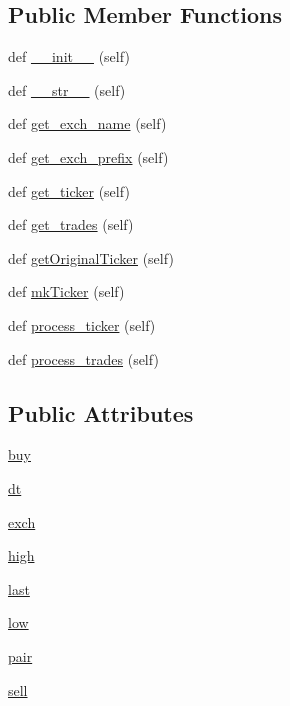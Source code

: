 \subsection*{Public Member Functions}
\begin{DoxyCompactItemize}
\item 
def \hyperlink{classexchange_1_1_fox_bit_a1f892137668748287116d902ef668d1a}{\+\_\+\+\_\+init\+\_\+\+\_\+} (self)
\item 
def \hyperlink{classexchange_1_1_fox_bit_ac21d1d06bf748dfd22ca35bc56a72e3b}{\+\_\+\+\_\+str\+\_\+\+\_\+} (self)
\item 
def \hyperlink{classexchange_1_1_fox_bit_a9bb3b48ee388b422f1d27c1774f0c9bf}{get\+\_\+exch\+\_\+name} (self)
\item 
def \hyperlink{classexchange_1_1_fox_bit_a091fb1b6e76b392b0a018a411f9da200}{get\+\_\+exch\+\_\+prefix} (self)
\item 
def \hyperlink{classexchange_1_1_fox_bit_aeb98818ddef05bb1beff5b55231d3760}{get\+\_\+ticker} (self)
\item 
def \hyperlink{classexchange_1_1_fox_bit_a80807753c2c595997857d097939c9283}{get\+\_\+trades} (self)
\item 
def \hyperlink{classexchange_1_1_fox_bit_adfca60ed33245c7bd9666893f6725bb9}{get\+Original\+Ticker} (self)
\item 
def \hyperlink{classexchange_1_1_fox_bit_a17b3a7fb364fbfd2c6cf34129194284c}{mk\+Ticker} (self)
\item 
def \hyperlink{classexchange_1_1_fox_bit_a813481c37754cc0c6e0b1cefa0ec0889}{process\+\_\+ticker} (self)
\item 
def \hyperlink{classexchange_1_1_fox_bit_a244f81e91b04a1118d2d17f6c8497cb5}{process\+\_\+trades} (self)
\end{DoxyCompactItemize}
\subsection*{Public Attributes}
\begin{DoxyCompactItemize}
\item 
\hyperlink{classexchange_1_1_fox_bit_acb7e709cc05e8314b1bdacd32e4dfc80}{buy}
\item 
\hyperlink{classexchange_1_1_fox_bit_a363f8488eb0423f88519c085ae6f168f}{dt}
\item 
\hyperlink{classexchange_1_1_fox_bit_a3922433dcfe54e39c3c0da12fa252658}{exch}
\item 
\hyperlink{classexchange_1_1_fox_bit_a4f6dfaecbcc17ceadddf52d266d9c00d}{high}
\item 
\hyperlink{classexchange_1_1_fox_bit_a5cdbc327b005014dc3b8bb6fb54a12fd}{last}
\item 
\hyperlink{classexchange_1_1_fox_bit_acd666444cff98fe477651120ddb0f915}{low}
\item 
\hyperlink{classexchange_1_1_fox_bit_abfd6daf1cbad94eb74bba4c97fe4a574}{pair}
\item 
\hyperlink{classexchange_1_1_fox_bit_ac1fae4ef7a43254b71d7173a5cc6eeaf}{sell}
\end{DoxyCompactItemize}
